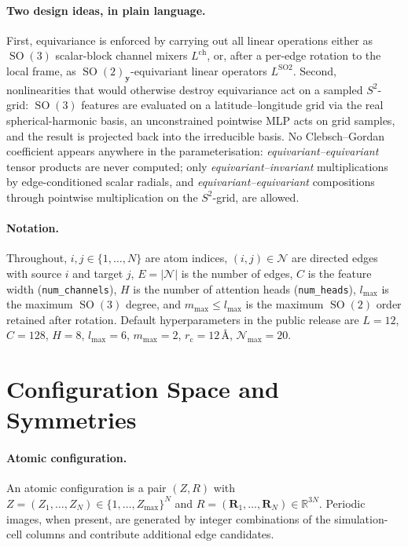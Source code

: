 \documentclass[11pt,a4paper]{article}
\DeclareMathOperator{\SO}{SO}
\newcommand{\R}{\mathbb{R}}
\newcommand{\Sph}{S^2}
\newcommand{\bR}{\bm{R}}
\newcommand{\by}{\bm{y}}
\newcommand{\rcut}{r_{\mathrm{c}}}
\newcommand{\lmax}{l_{\max}}
\newcommand{\mmax}{m_{\max}}
\newcommand{\Nb}{\mathcal{N}}
\theoremstyle{plain}
\theoremstyle{definition}
\theoremstyle{remark}
\begin{document}
\paragraph{Two design ideas, in plain language.}
First, equivariance is enforced by carrying out all linear operations either as
$\SO(3)$ scalar-block channel mixers $L^{\mathrm{ch}}$, or, after a per-edge
rotation to the local frame, as $\SO(2)_{\by}$-equivariant linear operators
$L^{\mathrm{SO2}}$. Second, nonlinearities that would otherwise destroy
equivariance act on a sampled $\Sph$-grid: $\SO(3)$ features are evaluated on a
latitude--longitude grid via the real spherical-harmonic basis, an
unconstrained pointwise MLP acts on grid samples, and the result is projected
back into the irreducible basis. No Clebsch--Gordan coefficient appears
anywhere in the parameterisation: \emph{equivariant--equivariant} tensor
products are never computed; only \emph{equivariant--invariant} multiplications
by edge-conditioned scalar radials, and \emph{equivariant--equivariant}
compositions through pointwise multiplication on the $\Sph$-grid, are allowed.

\paragraph{Notation.}
Throughout, $i,j\in\{1,\dots,N\}$ are atom indices, $(i,j)\in\Nb$ are directed
edges with source $i$ and target $j$, $E=|\Nb|$ is the number of edges, $C$ is
the feature width (\texttt{num\_channels}), $H$ is the number of attention
heads (\texttt{num\_heads}), $\lmax$ is the maximum $\SO(3)$ degree, and
$\mmax\le\lmax$ is the maximum $\SO(2)$ order retained after rotation. Default
hyperparameters in the public release are $L=12$, $C=128$, $H=8$, $\lmax=6$,
$\mmax=2$, $\rcut=12$\,\AA{}, $\Nb_{\max}=20$.

\section{Configuration Space and Symmetries}\label{sec:conf}

\paragraph{Atomic configuration.}
An atomic configuration is a pair $(Z,R)$ with
$Z=(Z_1,\dots,Z_N)\in\{1,\dots,Z_{\max}\}^N$ and
$R=(\bR_1,\dots,\bR_N)\in\R^{3N}$. Periodic images, when present, are generated
by integer combinations of the simulation-cell columns and contribute
additional edge candidates.
\end{document}
